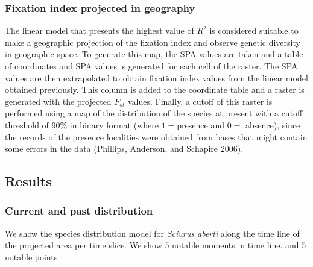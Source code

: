 \documentclass[
]{article}
\begin{document}
\hypertarget{fixation-index-projected-in-geography}{%
\subsubsection{Fixation index projected in
geography}\label{fixation-index-projected-in-geography}}

The linear model that presents the highest value of \(R^2\) is
considered suitable to make a geographic projection of the fixation
index and observe genetic diversity in geographic space. To generate
this map, the SPA values are taken and a table of coordinates and SPA
values is generated for each cell of the raster. The SPA values are then
extrapolated to obtain fixation index values from the linear model
obtained previously. This column is added to the coordinate table and a
raster is generated with the projected \(F_{st}\) values. Finally, a
cutoff of this raster is performed using a map of the distribution of
the species at present with a cutoff threshold of 90\% in binary format
(where \(1 =\)presence and \(0 =\) absence), since the records of the
presence localities were obtained from bases that might contain some
errors in the data (Phillips, Anderson, and Schapire 2006).

\hypertarget{results}{%
\subsection{Results}\label{results}}

\hypertarget{current-and-past-distribution}{%
\subsubsection{Current and past
distribution}\label{current-and-past-distribution}}

We show the species distribution model for \emph{Sciurus aberti} along
the time line of the projected area per time slice. We show 5 notable
moments in time line. and 5 notable points
\end{document}
